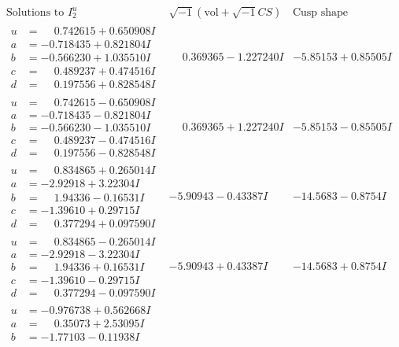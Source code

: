 \documentclass[1p]{elsarticle_modified}
\theoremstyle{definition}
\newcommand{\I}{\sqrt{-1}}
\begin{document}
$$\begin{array}{c|c|c}  
\text{Solutions to }I^u_{2}& \I (\text{vol} + \sqrt{-1}CS) & \text{Cusp shape}\\
 \hline 
\begin{aligned}
u &= \phantom{-}0.742615 + 0.650908 I \\
a &= -0.718435 + 0.821804 I \\
b &= -0.566230 + 1.035510 I \\
c &= \phantom{-}0.489237 + 0.474516 I \\
d &= \phantom{-}0.197556 + 0.828548 I\end{aligned}
 & \phantom{-}0.369365 - 1.227240 I & -5.85153 + 0.85505 I \\ \hline\begin{aligned}
u &= \phantom{-}0.742615 - 0.650908 I \\
a &= -0.718435 - 0.821804 I \\
b &= -0.566230 - 1.035510 I \\
c &= \phantom{-}0.489237 - 0.474516 I \\
d &= \phantom{-}0.197556 - 0.828548 I\end{aligned}
 & \phantom{-}0.369365 + 1.227240 I & -5.85153 - 0.85505 I \\ \hline\begin{aligned}
u &= \phantom{-}0.834865 + 0.265014 I \\
a &= -2.92918 + 3.22304 I \\
b &= \phantom{-}1.94336 - 0.16531 I \\
c &= -1.39610 + 0.29715 I \\
d &= \phantom{-}0.377294 + 0.097590 I\end{aligned}
 & -5.90943 - 0.43387 I & -14.5683 - 0.8754 I \\ \hline\begin{aligned}
u &= \phantom{-}0.834865 - 0.265014 I \\
a &= -2.92918 - 3.22304 I \\
b &= \phantom{-}1.94336 + 0.16531 I \\
c &= -1.39610 - 0.29715 I \\
d &= \phantom{-}0.377294 - 0.097590 I\end{aligned}
 & -5.90943 + 0.43387 I & -14.5683 + 0.8754 I \\ \hline\begin{aligned}
u &= -0.976738 + 0.562668 I \\
a &= \phantom{-}0.35073 + 2.53095 I \\
b &= -1.77103 - 0.11938 I \\

\end{aligned}
\end{array}$$
\end{document}
